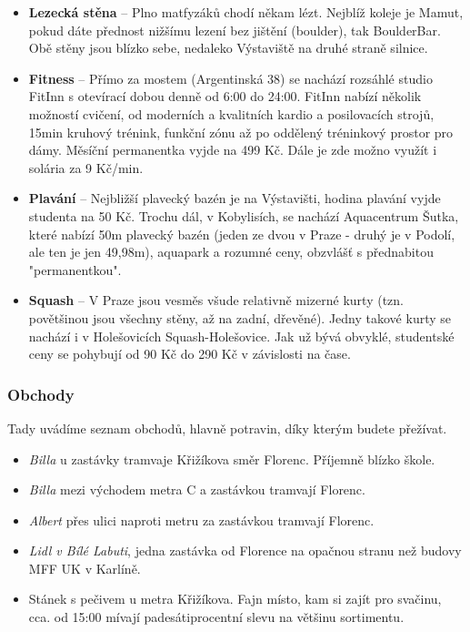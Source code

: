 \begin{itemize}
\item \textbf{Lezecká stěna} – Plno matfyzáků chodí někam lézt. Nejblíž koleje
je Mamut, pokud dáte přednost nižšímu lezení bez jištění (boulder), tak
BoulderBar. Obě stěny jsou blízko sebe, nedaleko Výstaviště na druhé straně
silnice.
\item \textbf{Fitness} – Přímo za mostem (Argentinská 38) se nachází rozsáhlé
studio FitInn s otevírací dobou denně od 6:00 do 24:00. FitInn nabízí několik
možností cvičení, od moderních a kvalitních kardio a posilovacích strojů, 15min
kruhový trénink, funkční zónu až po oddělený tréninkový prostor pro dámy.
Měsíční permanentka vyjde na 499 Kč. Dále je zde možno využít i solária za 9
Kč/min.
\item \textbf{Plavání} – Nejbližší plavecký bazén je na Výstavišti, hodina
plavání vyjde studenta na 50 Kč. Trochu dál, v Kobylisích, se nachází
Aquacentrum Šutka, které nabízí 50m plavecký bazén (jeden ze dvou v Praze -
druhý je v Podolí, ale ten je jen 49,98m), aquapark a rozumné ceny, obzvlášť s
přednabitou "permanentkou".
\item \textbf{Squash} – V Praze jsou vesměs všude relativně mizerné kurty (tzn.
povětšinou jsou všechny stěny, až na zadní, dřevěné). Jedny takové kurty se
nachází i v Holešovicích Squash-Holešovice. Jak už bývá obvyklé, studentské ceny
se pohybují od 90 Kč do 290 Kč v závislosti na čase.
\end{itemize}


\subsubsection{Obchody}
Tady uvádíme seznam obchodů, hlavně potravin, díky kterým budete přežívat.

\begin{itemize}
\item \textit{Billa} u zastávky tramvaje Křižíkova směr Florenc. Příjemně blízko
škole.
\item \textit{Billa} mezi východem metra C a zastávkou tramvají Florenc.
\item \textit{Albert} přes ulici naproti metru za zastávkou tramvají Florenc.
\item \textit{Lidl v Bílé Labuti}, jedna zastávka od Florence na opačnou stranu
než budovy MFF UK v Karlíně.
\item Stánek s pečivem u metra Křižíkova. Fajn místo, kam si zajít pro svačinu,
cca. od 15:00 mívají padesátiprocentní slevu na většinu sortimentu.
\end{itemize}

